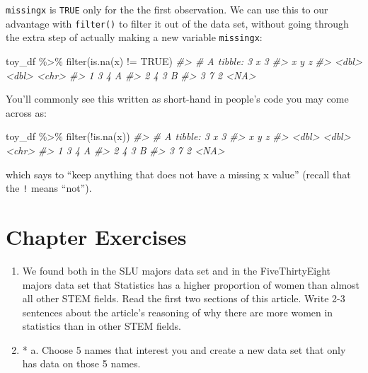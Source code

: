 \documentclass[
]{book}
\newenvironment{Shaded}{\begin{snugshade}}{\end{snugshade}}
\newcommand{\CommentTok}[1]{\textcolor[rgb]{0.56,0.35,0.01}{\textit{#1}}}
\newcommand{\ConstantTok}[1]{\textcolor[rgb]{0.00,0.00,0.00}{#1}}
\newcommand{\FunctionTok}[1]{\textcolor[rgb]{0.00,0.00,0.00}{#1}}
\newcommand{\NormalTok}[1]{#1}
\newcommand{\SpecialCharTok}[1]{\textcolor[rgb]{0.00,0.00,0.00}{#1}}
\begin{document}
\texttt{missingx} is \texttt{TRUE} only for the the first observation. We can use this to our advantage with \texttt{filter()} to filter it out of the data set, without going through the extra step of actually making a new variable \texttt{missingx}:

\begin{Shaded}
\begin{Highlighting}[]
\NormalTok{toy\_df }\SpecialCharTok{\%\textgreater{}\%} \FunctionTok{filter}\NormalTok{(}\FunctionTok{is.na}\NormalTok{(x) }\SpecialCharTok{!=} \ConstantTok{TRUE}\NormalTok{)}
\CommentTok{\#\textgreater{} \# A tibble: 3 x 3}
\CommentTok{\#\textgreater{}       x     y z    }
\CommentTok{\#\textgreater{}   \textless{}dbl\textgreater{} \textless{}dbl\textgreater{} \textless{}chr\textgreater{}}
\CommentTok{\#\textgreater{} 1     3     4 A    }
\CommentTok{\#\textgreater{} 2     4     3 B    }
\CommentTok{\#\textgreater{} 3     7     2 \textless{}NA\textgreater{}}
\end{Highlighting}
\end{Shaded}

You'll commonly see this written as short-hand in people's code you may come across as:

\begin{Shaded}
\begin{Highlighting}[]
\NormalTok{toy\_df }\SpecialCharTok{\%\textgreater{}\%} \FunctionTok{filter}\NormalTok{(}\SpecialCharTok{!}\FunctionTok{is.na}\NormalTok{(x))}
\CommentTok{\#\textgreater{} \# A tibble: 3 x 3}
\CommentTok{\#\textgreater{}       x     y z    }
\CommentTok{\#\textgreater{}   \textless{}dbl\textgreater{} \textless{}dbl\textgreater{} \textless{}chr\textgreater{}}
\CommentTok{\#\textgreater{} 1     3     4 A    }
\CommentTok{\#\textgreater{} 2     4     3 B    }
\CommentTok{\#\textgreater{} 3     7     2 \textless{}NA\textgreater{}}
\end{Highlighting}
\end{Shaded}

which says to ``keep anything that does not have a missing x value'' (recall that the \texttt{!} means ``not'').

\hypertarget{chapexercise-3}{%
\section{Chapter Exercises}\label{chapexercise-3}}

\begin{enumerate}
\def\labelenumi{\arabic{enumi}.}
\item
  We found both in the SLU majors data set and in the FiveThirtyEight majors data set that Statistics has a higher proportion of women than almost all other STEM fields. Read the first two sections of this article. Write 2-3 sentences about the article's reasoning of why there are more women in statistics than in other STEM fields.
\item
  * a. Choose 5 names that interest you and create a new data set that only has data on those 5 names.
\end{enumerate}
\end{document}
